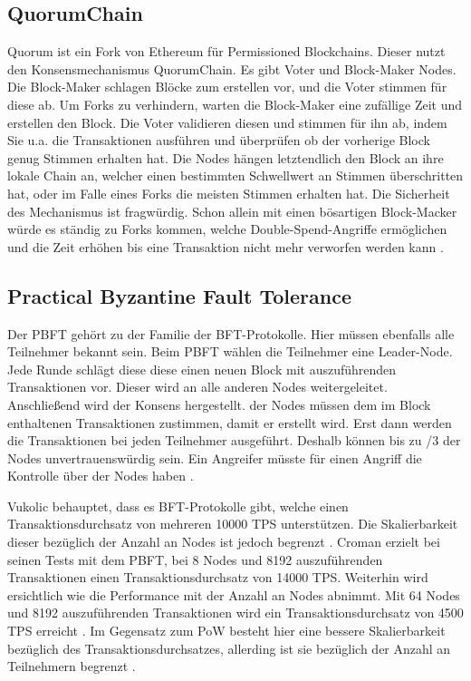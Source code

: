\subsection{QuorumChain}
Quorum ist ein Fork von Ethereum für Permissioned Blockchains. Dieser nutzt den Konsensmechanismus QuorumChain. Es gibt Voter und Block-Maker Nodes. Die Block-Maker schlagen Blöcke zum erstellen vor, und die Voter stimmen für diese ab. Um Forks zu verhindern, warten die Block-Maker eine zufällige Zeit und erstellen den Block. Die Voter validieren diesen und stimmen für ihn ab, indem Sie u.a. die Transaktionen ausführen und überprüfen ob der vorherige Block genug Stimmen erhalten hat. Die Nodes hängen letztendlich den Block an ihre lokale Chain an, welcher einen bestimmten Schwellwert an Stimmen überschritten hat, oder im Falle eines Forks die meisten Stimmen erhalten hat. Die Sicherheit des Mechanismus ist fragwürdig. Schon allein mit einen bösartigen Block-Macker würde es ständig zu Forks kommen, welche Double-Spend-Angriffe ermöglichen und die Zeit erhöhen bis eine Transaktion nicht mehr verworfen werden kann \cite{CachinBlockchainConsensusProtocols2017}.

\subsection{Practical Byzantine Fault Tolerance}
Der \acs{PBFT} gehört zu der Familie der \acs{BFT}-Protokolle. Hier müssen ebenfalls alle Teilnehmer bekannt sein. Beim \acs{PBFT} wählen die Teilnehmer eine Leader-Node. Jede Runde schlägt diese diese einen neuen Block mit auszuführenden Transaktionen vor. Dieser wird an alle anderen Nodes weitergeleitet. Anschließend wird der Konsens hergestellt.  der Nodes müssen dem im Block enthaltenen Transaktionen zustimmen, damit er erstellt wird. Erst dann werden die Transaktionen bei jeden Teilnehmer ausgeführt. Deshalb können bis zu /3 der Nodes unvertrauenswürdig sein. Ein Angreifer müsste für einen Angriff die Kontrolle über  der Nodes haben \cite{SukhwaniPerformanceModelingPBFT2017a}\cite{ZhengBlockchainChallengesOpportunities2017}. 

Vukolic behauptet, dass es \acs{BFT}-Protokolle gibt, welche einen Transaktionsdurchsatz von mehreren 10000 TPS unterstützen. Die Skalierbarkeit dieser bezüglich der Anzahl an Nodes ist jedoch begrenzt \cite{Vukolicquestscalableblockchain2015}. Croman erzielt bei seinen Tests mit dem PBFT, bei 8 Nodes und 8192 auszuführenden Transaktionen einen Transaktionsdurchsatz von 14000 TPS. Weiterhin wird ersichtlich wie die Performance mit der Anzahl an Nodes abnimmt. Mit 64 Nodes und 8192 auszuführenden Transaktionen wird ein Transaktionsdurchsatz von 4500 TPS erreicht \cite{CromanScalingDecentralizedBlockchains2016}. Im Gegensatz zum \acs{PoW} besteht hier eine bessere Skalierbarkeit bezüglich des Transaktionsdurchsatzes, allerding ist sie bezüglich der Anzahl an Teilnehmern begrenzt \cite{Vukolicquestscalableblockchain2015}.

